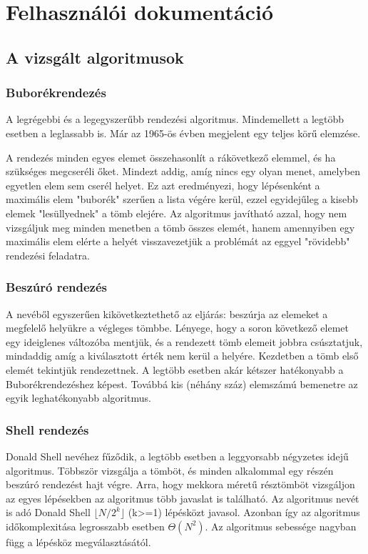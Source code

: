 \documentclass{elteikthesis}
\begin{document}
\chapter{Felhasználói dokumentáció}

\section{A vizsgált algoritmusok}

\subsection{Buborékrendezés}
A legrégebbi és a legegyszerűbb rendezési algoritmus. Mindemellett a legtöbb esetben a leglassabb is. Már az 1965-ös évben megjelent egy teljes körű elemzése\cite{Demuth}.\par
 A rendezés minden egyes elemet összehasonlít a rákövetkező elemmel, és ha szükséges megcseréli őket. Mindezt addig, amíg nincs egy olyan menet, amelyben egyetlen elem sem cserél helyet. Ez azt eredményezi, hogy lépésenként a maximális elem "buborék" szerűen a lista végére kerül, ezzel egyidejűleg a kisebb elemek "lesüllyednek" a tömb elejére. Az algoritmus javítható azzal, hogy nem vizsgáljuk meg minden menetben a tömb összes elemét, hanem amennyiben egy maximális elem elérte a helyét visszavezetjük a problémát az eggyel "rövidebb" rendezési feladatra\cite{Fekete}.

\subsection{Beszúró rendezés}
A nevéből egyszerűen kikövetkeztethető az eljárás: beszúrja az elemeket a megfelelő helyükre a végleges tömbbe. Lényege, hogy a soron következő elemet egy ideiglenes változóba mentjük, és a rendezett tömb elemeit jobbra csúsztatjuk, mindaddig amíg a kiválasztott érték nem kerül a helyére. Kezdetben a tömb első elemét tekintjük rendezettnek. A legtöbb esetben akár kétszer hatékonyabb a Buborékrendezéshez képest.\cite{Fekete} Továbbá kis (néhány száz) elemszámú bemenetre az egyik leghatékonyabb algoritmus.

\subsection{Shell rendezés}
Donald Shell nevéhez fűződik, a legtöbb esetben a leggyorsabb négyzetes idejű algoritmus. Többször vizsgálja a tömböt, és minden alkalommal egy részén beszúró rendezést hajt végre. Arra, hogy mekkora méretű résztömböt vizsgáljon az egyes lépésekben az algoritmus több javaslat is található. Az algoritmus nevét is adó Donald Shell $\lfloor N/2^k \rfloor$ (k>=1) lépésközt javasol. Azonban így az algoritmus időkomplexitása legrosszabb esetben $\Theta(N^2)$. Az algoritmus sebessége nagyban függ a lépésköz megválasztásától.
\end{document}

